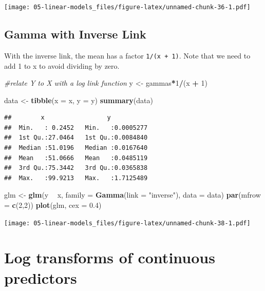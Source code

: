 \documentclass[openany]{book}
\newenvironment{Shaded}{\begin{snugshade}}{\end{snugshade}}
\newcommand{\CommentTok}[1]{\textcolor[rgb]{0.56,0.35,0.01}{\textit{#1}}}
\newcommand{\DataTypeTok}[1]{\textcolor[rgb]{0.13,0.29,0.53}{#1}}
\newcommand{\DecValTok}[1]{\textcolor[rgb]{0.00,0.00,0.81}{#1}}
\newcommand{\FloatTok}[1]{\textcolor[rgb]{0.00,0.00,0.81}{#1}}
\newcommand{\KeywordTok}[1]{\textcolor[rgb]{0.13,0.29,0.53}{\textbf{#1}}}
\newcommand{\NormalTok}[1]{#1}
\newcommand{\OperatorTok}[1]{\textcolor[rgb]{0.81,0.36,0.00}{\textbf{#1}}}
\newcommand{\StringTok}[1]{\textcolor[rgb]{0.31,0.60,0.02}{#1}}
\begin{document}
\texttt{[image: 05-linear-models\_files/figure-latex/unnamed-chunk-36-1.pdf]}

\hypertarget{gamma-with-inverse-link}{%
\subsection{Gamma with Inverse Link}\label{gamma-with-inverse-link}}

With the inverse link, the mean has a factor \texttt{1/(x\ +\ 1)}. Note that we need to add 1 to x to avoid dividing by zero.

\begin{Shaded}
\begin{Highlighting}[]
\CommentTok{#relate Y to X with a log link function}
\NormalTok{y <-}\StringTok{ }\NormalTok{gammas}\OperatorTok{*}\DecValTok{1}\OperatorTok{/}\NormalTok{(x }\OperatorTok{+}\StringTok{ }\DecValTok{1}\NormalTok{)}

\NormalTok{data <-}\StringTok{ }\KeywordTok{tibble}\NormalTok{(}\DataTypeTok{x =}\NormalTok{ x, }\DataTypeTok{y  =}\NormalTok{ y)}
\KeywordTok{summary}\NormalTok{(data)}
\end{Highlighting}
\end{Shaded}

\begin{verbatim}
##        x                 y            
##  Min.   : 0.2452   Min.   :0.0005277  
##  1st Qu.:27.0464   1st Qu.:0.0084840  
##  Median :51.0196   Median :0.0167640  
##  Mean   :51.0666   Mean   :0.0485119  
##  3rd Qu.:75.3442   3rd Qu.:0.0365838  
##  Max.   :99.9213   Max.   :1.7125489
\end{verbatim}

\begin{Shaded}
\begin{Highlighting}[]
\NormalTok{glm <-}\StringTok{ }\KeywordTok{glm}\NormalTok{(y }\OperatorTok{~}\StringTok{ }\NormalTok{x, }\DataTypeTok{family =} \KeywordTok{Gamma}\NormalTok{(}\DataTypeTok{link =} \StringTok{"inverse"}\NormalTok{), }\DataTypeTok{data =}\NormalTok{ data)}
\KeywordTok{par}\NormalTok{(}\DataTypeTok{mfrow =} \KeywordTok{c}\NormalTok{(}\DecValTok{2}\NormalTok{,}\DecValTok{2}\NormalTok{))}
\KeywordTok{plot}\NormalTok{(glm, }\DataTypeTok{cex =} \FloatTok{0.4}\NormalTok{)}
\end{Highlighting}
\end{Shaded}

\texttt{[image: 05-linear-models\_files/figure-latex/unnamed-chunk-38-1.pdf]}

\hypertarget{log-transforms-of-continuous-predictors}{%
\section{Log transforms of continuous predictors}\label{log-transforms-of-continuous-predictors}}
\end{document}
